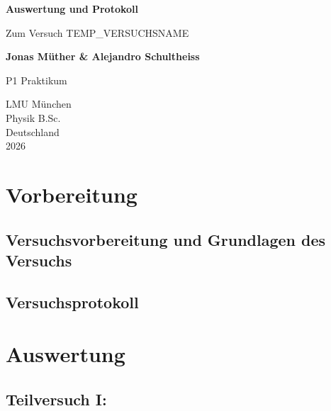 \documentclass{report}
\begin{document}

\begin{titlepage}
    \begin{center}
        \vspace*{1cm}
            
        \Huge
        \textbf{Auswertung und Protokoll}
            
        \vspace{0.5cm}
        \LARGE
        Zum Versuch TEMP_VERSUCHSNAME
        
        \vspace{1.8cm}

        \textbf{Jonas Müther \& Alejandro Schultheiss}
        \vfill
            
        P1 Praktikum\\
       
            
        \vspace{0.8cm}
  

        \vspace{1.8cm}
        \Large
        LMU München \\
        Physik B.Sc.\\
        Deutschland\\
        2026
            
    \end{center}
\end{titlepage}
\tableofcontents

\newpage
\chapter{Vorbereitung}

\section{Versuchsvorbereitung und Grundlagen des Versuchs}


\section{Versuchsprotokoll}


\newpage
\chapter{Auswertung}
\section{Teilversuch I:}
\end{document}
